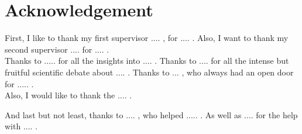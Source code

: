 \section*{Acknowledgement} %

First, I like to thank my first supervisor .... , for .... . Also, I want to thank my second supervisor .... for .... .\\

\noindent
Thanks to ..... for all the insights into .... . Thanks to .... for all the intense but fruitful scientific debate about .... . Thanks to ... , who always had an open door for ..... . \\

\noindent
Also, I would like to thank the .... . \newline

\noindent
And last but not least, thanks to .... , who helped ..... . As well as .... for the help with .... . 